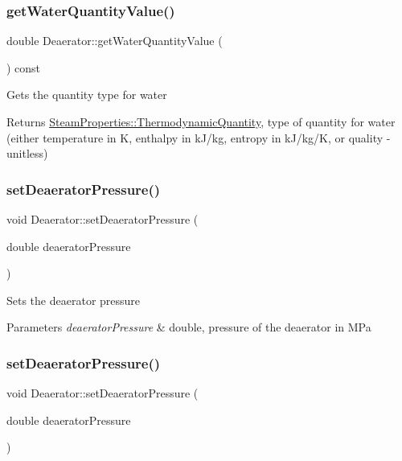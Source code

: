 \subsubsection{\texorpdfstring{get\+Water\+Quantity\+Value()}{getWaterQuantityValue()}\hspace{0.1cm}{\footnotesize\ttfamily [3/3]}}
{\footnotesize\ttfamily double Deaerator\+::get\+Water\+Quantity\+Value (\begin{DoxyParamCaption}{ }\end{DoxyParamCaption}) const}

Gets the quantity type for water \begin{DoxyReturn}{Returns}
\hyperlink{class_steam_properties_ae0294bedf7d178c2d8fb6aed0f62fbff}{Steam\+Properties\+::\+Thermodynamic\+Quantity}, type of quantity for water (either temperature in K, enthalpy in k\+J/kg, entropy in k\+J/kg/K, or quality -\/ unitless) 
\end{DoxyReturn}
\mbox{\label{class_deaerator_a5b20d3aba98b21928cce70b45e843ff3}} 
\subsubsection{\texorpdfstring{set\+Deaerator\+Pressure()}{setDeaeratorPressure()}\hspace{0.1cm}{\footnotesize\ttfamily [1/3]}}
{\footnotesize\ttfamily void Deaerator\+::set\+Deaerator\+Pressure (\begin{DoxyParamCaption}\item[{double}]{deaerator\+Pressure }\end{DoxyParamCaption})}

Sets the deaerator pressure 
\begin{DoxyParams}{Parameters}
{\em deaerator\+Pressure} & double, pressure of the deaerator in M\+Pa \\
\hline
\end{DoxyParams}
\mbox{\label{class_deaerator_a5b20d3aba98b21928cce70b45e843ff3}} 
\subsubsection{\texorpdfstring{set\+Deaerator\+Pressure()}{setDeaeratorPressure()}\hspace{0.1cm}{\footnotesize\ttfamily [2/3]}}
{\footnotesize\ttfamily void Deaerator\+::set\+Deaerator\+Pressure (\begin{DoxyParamCaption}\item[{double}]{deaerator\+Pressure }\end{DoxyParamCaption})}

